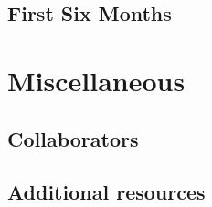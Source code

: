 \documentclass[
]{book}
\begin{document}
\hypertarget{first-six-months}{%
\section{First Six Months}\label{first-six-months}}

\hypertarget{miscellaneous}{%
\chapter{Miscellaneous}\label{miscellaneous}}

\hypertarget{collaborators}{%
\section{Collaborators}\label{collaborators}}

\hypertarget{extra-resources}{%
\section{Additional resources}\label{extra-resources}}
\end{document}

